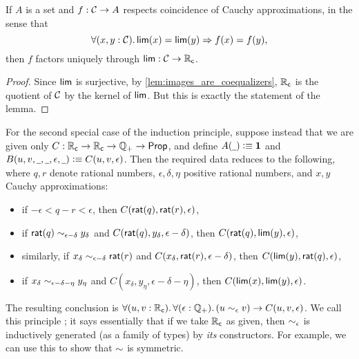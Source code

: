 % 

\begin{lem} \label{RC-lim-factor}
  If $A$ is a set and $f : \mathcal{C} \to A$ respects coincidence of Cauchy approximations, in the sense that
  \begin{equation*}
    \fall{x, y : \CAP} \rclim(x) = \rclim(y) \Rightarrow f(x) = f(y),
  \end{equation*}
  then $f$ factors uniquely through $\mathsf{lim} : \mathcal{C} \to \mathbb{R}_\mathsf{c}$.
\end{lem}
\begin{proof}
  Since $\mathsf{lim}$ is surjective, by \autoref{lem:images_are_coequalizers}, $\mathbb{R}_\mathsf{c}$ is the quotient of $\mathcal{C}$ by the kernel of $\mathsf{lim}$.
  But this is exactly the statement of the lemma.
\end{proof}

For the second special case of the induction principle, suppose instead that we are given only $C:\mathbb{R}_\mathsf{c}\to\mathbb{R}_\mathsf{c}\to\mathbb{Q}_{+}\to\mathsf{Prop}$, and define $A(\mathord{\underline{\hspace{1ex}}})\vcentcolon\equiv\mathbf{1}$ and $B(u,v,\mathord{\underline{\hspace{1ex}}},\mathord{\underline{\hspace{1ex}}},\epsilon,\mathord{\underline{\hspace{1ex}}})\vcentcolon\equiv C(u,v,\epsilon)$.
Then the required data reduces to the following, where $q, r$ denote rational numbers, $\epsilon, \delta, \eta$ positive rational numbers, and $x, y$ Cauchy approximations:
\begin{itemize}
\item if $-\epsilon < q - r < \epsilon$, then $C(\mathsf{rat}(q),\mathsf{rat}(r),\epsilon)$,
\item if $\mathsf{rat}(q) \sim_{\epsilon - \delta} y_\delta$ and
  $C(\mathsf{rat}(q),y_\delta,\epsilon-\delta)$,
  then $C(\mathsf{rat}(q),\mathsf{lim}(y),\epsilon)$,
\item similarly, if $x_\delta \sim_{\epsilon - \delta} \mathsf{rat}(r)$ and
  $C(x_\delta,\mathsf{rat}(r),\epsilon-\delta)$,
  then $C(\mathsf{lim}(y),\mathsf{rat}(q),\epsilon)$,
\item if $x_\delta \sim_{\epsilon - \delta - \eta} y_\eta$ and
  $C(x_\delta,y_\eta,{\epsilon - \delta - \eta})$,
  then $C(\mathsf{lim}(x),\mathsf{lim}(y),\epsilon)$.
\end{itemize}
The resulting conclusion is $\fall{u,v:\RC}{\epsilon:\Qp} (u\close\epsilon v) \to C(u,v,\epsilon)$.
We call this principle ; it says essentially that if we take $\mathbb{R}_\mathsf{c}$ as given, then $\sim_{\epsilon}$ is inductively generated (as a family of types) by \emph{its} constructors.
For example, we can use this to show that $\mathord\sim$ is symmetric.


